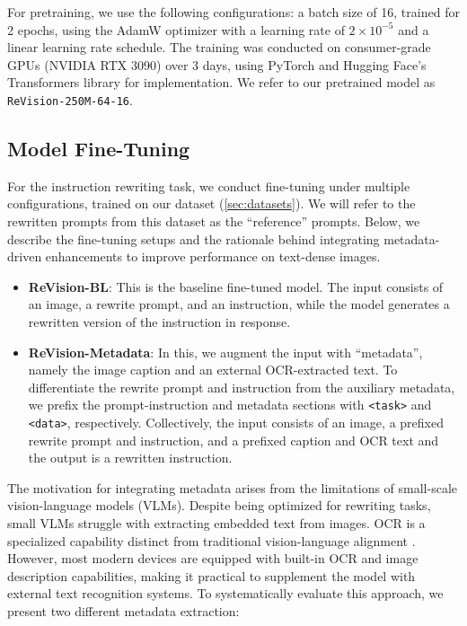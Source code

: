 For pretraining, we use the following configurations: a batch size of 16, trained for 2 epochs, using the AdamW optimizer with a learning rate of $2\times10^{-5}$ and a linear learning rate schedule. The training was conducted on consumer-grade GPUs (NVIDIA RTX 3090) over 3 days, using PyTorch and Hugging Face’s Transformers library for implementation. We refer to our pretrained model as \texttt{ReVision-250M-64-16}.

\subsection{Model Fine-Tuning}
For the instruction rewriting task, we conduct fine-tuning under multiple configurations, trained on our dataset (\ref{sec:datasets}). We will refer to the rewritten prompts from this dataset as the ``reference'' prompts. Below, we describe the fine-tuning setups and the rationale behind integrating metadata-driven enhancements to improve performance on text-dense images.

\begin{itemize}
\item \textbf{ReVision-BL}: This is the baseline fine-tuned model. The input consists of an image, a rewrite prompt, and an instruction, while the model generates a rewritten version of the instruction in response.

\item \textbf{ReVision-Metadata}: In this, we augment the input with ``metadata'', namely the image caption and an external OCR-extracted text. To differentiate the rewrite prompt and instruction from the auxiliary metadata, we prefix the prompt-instruction and metadata sections with \texttt{<task>} and \texttt{<data>}, respectively. Collectively, the input consists of an image, a prefixed rewrite prompt and instruction, and a prefixed caption and OCR text and the output is a rewritten instruction. 
\end{itemize}

The motivation for integrating metadata arises from the limitations of small-scale vision-language models (VLMs). Despite being optimized for rewriting tasks, small VLMs struggle with extracting embedded text from images. OCR is a specialized capability distinct from traditional vision-language alignment \cite{lamm2024can, nagaonkar2025benchmarking}. However, most modern devices are equipped with built-in OCR and image description capabilities, making it practical to supplement the model with external text recognition systems. To systematically evaluate this approach, we present two different metadata extraction:

